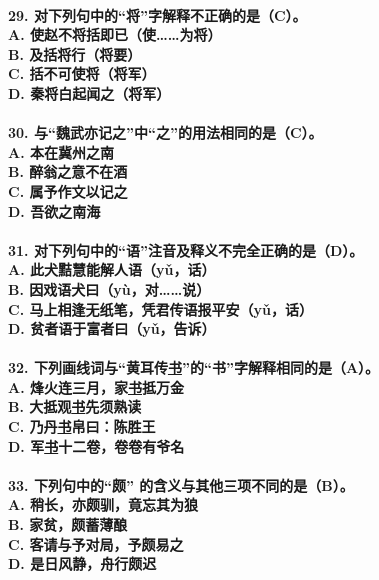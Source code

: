 \documentclass[UTF8]{ctexart} %
\begin{document}
\paragraph{
29. 对下列句中的“将”字解释不正确的是（\color{red}C\color{black}）。 \\
    A. 使赵不将括即已（使……为将） \\
    B. 及括将行（将要） \\
    C. 括不可使将（将军） \\
    D. 秦将白起闻之（将军）
}
\paragraph{
30. 与“魏武亦记之”中“之”的用法相同的是（\color{red}C\color{black}）。 \\
    A. 本在冀州之南 \\
    B. 醉翁之意不在酒 \\
    C. 属予作文以记之 \\
    D. 吾欲之南海
}
\paragraph{
31. 对下列句中的“语”注音及释义不完全正确的是（\color{red}D\color{black}）。 \\
    A. 此犬黠慧能解人语（yǔ，话） \\
    B. 因戏语犬曰（yù，对……说） \\
    C. 马上相逢无纸笔，凭君传语报平安（yǔ，话） \\
    D. 贫者语于富者曰（yǔ，告诉）
}
\paragraph{
32. 下列画线词与“黄耳传\uline{书}”的“书”字解释相同的是（\color{red}A\color{black}）。 \\
    A. 烽火连三月，家\uline{书}抵万金 \\
    B. 大抵观\uline{书}先须熟读 \\
    C. 乃丹\uline{书}帛曰：陈胜王 \\
    D. 军\uline{书}十二卷，卷卷有爷名
}
\paragraph{
33. 下列句中的“颇” 的含义与其他三项不同的是（\color{red}B\color{black}）。 \\
    A. 稍长，亦颇驯，竟忘其为狼 \\
    B. 家贫，颇蓄薄酿 \\
    C. 客请与予对局，予颇易之 \\
    D. 是日风静，舟行颇迟
}
\end{document}

